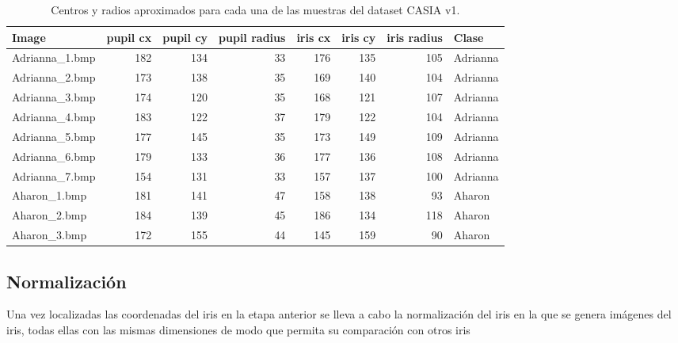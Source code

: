 \begin{table}[h]
    \centering
        \begin{tabular}{lrrrrrrl}
        \toprule
                  Image &  pupil cx &  pupil cy &  pupil radius &  iris cx &  iris cy &  iris radius &     Clase \\
        \midrule
         Adrianna\_1.bmp &             182 &             134 &            33 &            176 &            135 &          105 &  Adrianna \\
         Adrianna\_2.bmp &             173 &             138 &            35 &            169 &            140 &          104 &  Adrianna \\
         Adrianna\_3.bmp &             174 &             120 &            35 &            168 &            121 &          107 &  Adrianna \\
         Adrianna\_4.bmp &             183 &             122 &            37 &            179 &            122 &          104 &  Adrianna \\
         Adrianna\_5.bmp &             177 &             145 &            35 &            173 &            149 &          109 &  Adrianna \\
         Adrianna\_6.bmp &             179 &             133 &            36 &            177 &            136 &          108 &  Adrianna \\
         Adrianna\_7.bmp &             154 &             131 &            33 &            157 &            137 &          100 &  Adrianna \\
           Aharon\_1.bmp &             181 &             141 &            47 &            158 &            138 &           93 &    Aharon \\
           Aharon\_2.bmp &             184 &             139 &            45 &            186 &            134 &          118 &    Aharon \\
           Aharon\_3.bmp &             172 &             155 &            44 &            145 &            159 &           90 &    Aharon \\
        \bottomrule
        \end{tabular}
    \caption{Centros y radios aproximados para cada una de las muestras del dataset CASIA v1.}
    \label{tab:my_label}
\end{table}


\subsection{Normalización}
Una vez localizadas las coordenadas del iris en la etapa anterior se lleva a cabo la normalización del iris en la que se genera imágenes del iris, todas ellas con las mismas dimensiones de modo que permita su comparación con otros iris ~\cite{daugman:1993,aksha:2019,alvarg:2020}

